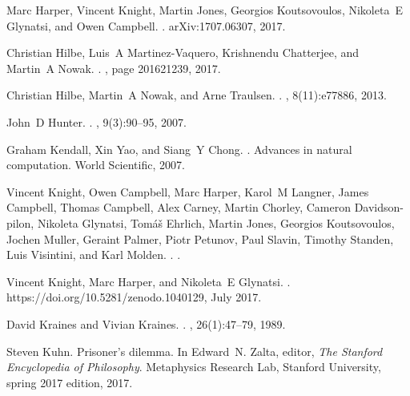 \documentclass[10pt,letterpaper]{article}
\begin{document}
\begin{thebibliography}{10}
Marc Harper, Vincent Knight, Martin Jones, Georgios Koutsovoulos, Nikoleta~E
  Glynatsi, and Owen Campbell.
.
\newblock arXiv:1707.06307, 2017.

Christian Hilbe, Luis~A Martinez-Vaquero, Krishnendu Chatterjee, and Martin~A
  Nowak.
.
, page
  201621239, 2017.

Christian Hilbe, Martin~A Nowak, and Arne Traulsen.
.
, 8(11):e77886, 2013.

John~D Hunter.
.
, 9(3):90--95, 2007.

Graham Kendall, Xin Yao, and Siang~Y Chong.
.
\newblock Advances in natural computation. World Scientific, 2007.

Vincent Knight, Owen Campbell, Marc Harper, Karol~M Langner, James Campbell,
  Thomas Campbell, Alex Carney, Martin Chorley, Cameron Davidson-pilon,
  Nikoleta Glynatsi, Tom{\'{a}}{\v{s}} Ehrlich, Martin Jones, Georgios
  Koutsovoulos, Jochen Muller, Geraint Palmer, Piotr Petunov, Paul Slavin,
  Timothy Standen, Luis Visintini, and Karl Molden.
.
.

Vincent Knight, Marc Harper, and Nikoleta~E Glynatsi.
.
\newblock https://doi.org/10.5281/zenodo.1040129, July 2017.

David Kraines and Vivian Kraines.
.
, 26(1):47--79, 1989.

Steven Kuhn.
\newblock Prisoner's dilemma.
\newblock In Edward~N. Zalta, editor, {\em The Stanford Encyclopedia of
  Philosophy}. Metaphysics Research Lab, Stanford University, spring 2017
  edition, 2017.


\end{thebibliography}
\end{document}
